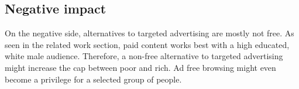 \subsection{Negative impact}
On the negative side, alternatives to targeted advertising are mostly not free. As seen in the related work section, paid content works best with a high educated, white male audience. Therefore, a non-free alternative to targeted advertising might increase the cap between poor and rich. Ad free browsing might even become a privilege for a selected group of people.